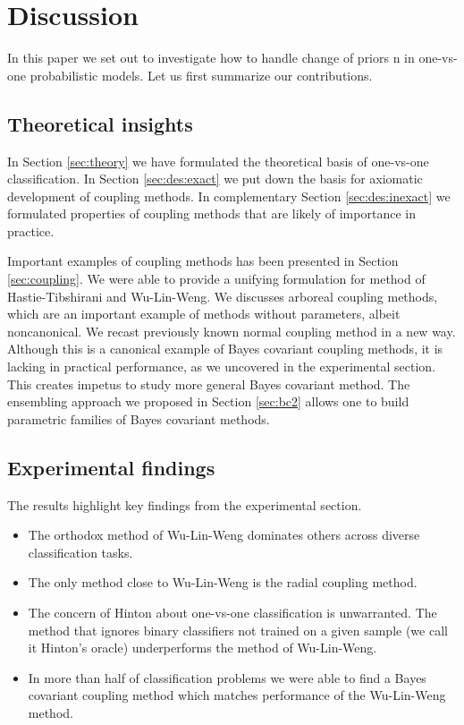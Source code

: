 \section{Discussion}

In this paper we set out to investigate how to handle change of priors n in one-vs-one probabilistic models. Let us first summarize our contributions.

\subsection{Theoretical insights}

In Section \ref{sec:theory} we have formulated the theoretical basis of one-vs-one classification. In Section \ref{sec:des:exact} we put down the basis for axiomatic development of coupling methods. In complementary Section \ref{sec:des:inexact} we formulated properties of coupling methods that are likely of importance in practice.

Important examples of coupling methods has been presented in Section \ref{sec:coupling}. We were able to provide a unifying formulation for method of Hastie-Tibshirani and Wu-Lin-Weng. We discusses arboreal coupling methods, which are an important example of methods without parameters, albeit noncanonical. We recast previously known normal coupling method in a new way. Although this is a canonical example of Bayes covariant coupling methods,  it is lacking in practical performance, as  we uncovered in the experimental section. This creates impetus to study more general Bayes covariant method. The  ensembling approach we proposed in Section \ref{sec:bc2} allows one to build parametric families of Bayes covariant methods.

\subsection{Experimental findings} 

The results highlight key findings from the experimental section.

\begin{itemize}
	\item The orthodox method of Wu-Lin-Weng dominates others across diverse classification tasks.
	\item The only method close to Wu-Lin-Weng is the radial coupling method.
	\item The concern of Hinton about one-vs-one classification is unwarranted. The method that ignores binary classifiers not trained on a given sample (we call it Hinton's oracle) underperforms the method of Wu-Lin-Weng.
	\item In more than half of classification problems we were able to find a Bayes covariant coupling method which matches performance of the Wu-Lin-Weng method. 
\end{itemize}



